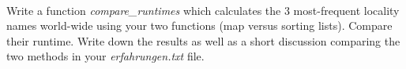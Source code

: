  \\
Write a function \textit{compare\_runtimes} which calculates the 3 
most-frequent locality names world-wide using your two functions (map versus sorting lists). Compare their runtime. Write down the results as well as a short discussion comparing the two methods in your \textit{erfahrungen.txt} file.
